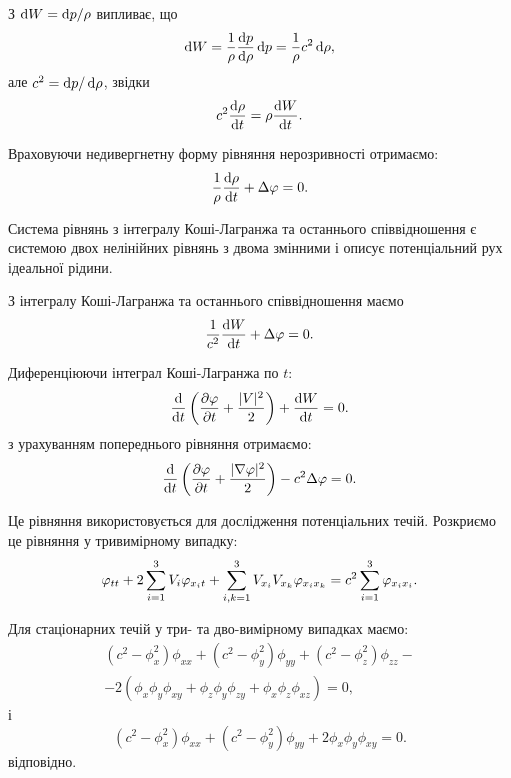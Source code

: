 З $\mathop{}\!\mathrm{d} W = \mathop{}\!\mathrm{d} p / \rho$ випливає, що
\begin{equation}
	\mathop{}\!\mathrm{d} W = \frac{1}{\rho} \frac{\mathop{}\!\mathrm{d} p}{\mathop{}\!\mathrm{d} \rho} \mathop{}\!\mathrm{d} p = \frac{1}{\rho} c^2 \mathop{}\!\mathrm{d} \rho,
\end{equation}
але $c^2 = \mathop{}\!\mathrm{d} p / \mathop{}\!\mathrm{d} \rho$, звідки
\begin{equation}
	c^2  \frac{\mathop{}\!\mathrm{d} \rho}{\mathop{}\!\mathrm{d} t} = \rho  \frac{\mathop{}\!\mathrm{d} W}{\mathop{}\!\mathrm{d} t}.
\end{equation}

Враховуючи недивергнетну форму рівняння нерозривності отримаємо:
\begin{equation}
	\frac{1}{\rho} \frac{\mathop{}\!\mathrm{d} \rho}{\mathop{}\!\mathrm{d} t} + \Delta \varphi = 0.
\end{equation}

Система рівнянь з інтегралу Коші-Лагранжа та останнього співвідношення є системою двох нелінійних рівнянь з двома змінними і описує потенціальний рух ідеальної рідини. \medskip

З інтегралу Коші-Лагранжа та останнього співвідношення маємо
\begin{equation}
	\frac{1}{c^2} \frac{\mathop{}\!\mathrm{d} W}{\mathop{}\!\mathrm{d} t} + \Delta \varphi = 0.
\end{equation}

Диференціюючи інтеграл Коші-Лагранжа по $t$:
\begin{equation}
	\frac{\mathop{}\!\mathrm{d}}{\mathop{}\!\mathrm{d} t} \left( \frac{\partial \varphi}{\partial t} + \frac{|V|^2}{2} \right) + \frac{\mathop{}\!\mathrm{d} W}{\mathop{}\!\mathrm{d} t} = 0.
\end{equation}
з урахуванням попереднього рівняння отримаємо:
\begin{equation}
	\frac{\mathop{}\!\mathrm{d}}{\mathop{}\!\mathrm{d} t} \left( \frac{\partial \varphi}{\partial t} + \frac{|\nabla \varphi|^2}{2} \right) - c^2 \Delta \varphi = 0.
\end{equation}

Це рівняння використовується для дослідження потенціальних течій. Розкриємо це рівняння у тривимірному випадку:
\begin{equation}
	\varphi_{tt} + 2 \displaystyle\sum\limits_{i = 1}^3 V_i \varphi_{x_i t} + \displaystyle\sum\limits_{i,k = 1}^3 V_{x_i} V_{x_k} \varphi_{x_i x_k} = c^2 \displaystyle\sum\limits_{i = 1}^3 \varphi_{x_i x_i}.
\end{equation}

Для стаціонарних течій у три- та дво-вимірному випадках маємо:
\begin{multline}
	(c^2 -\phi_x^2)\phi_{xx}+(c^2-\phi_y^2)\phi_{yy}+(c^2-\phi_z^2)\phi_{zz}-\\
	-2(\phi_x\phi_y\phi_{xy}+\phi_z\phi_y\phi_{zy}+\phi_x\phi_z\phi_{xz})=0,
\end{multline}
і
\begin{equation}
	(c^2-\phi_x^2)\phi_{xx}+(c^2-\phi_y^2)\phi_{yy}+2\phi_x\phi_y\phi_{xy}=0.
\end{equation}
відповідно. \medskip

